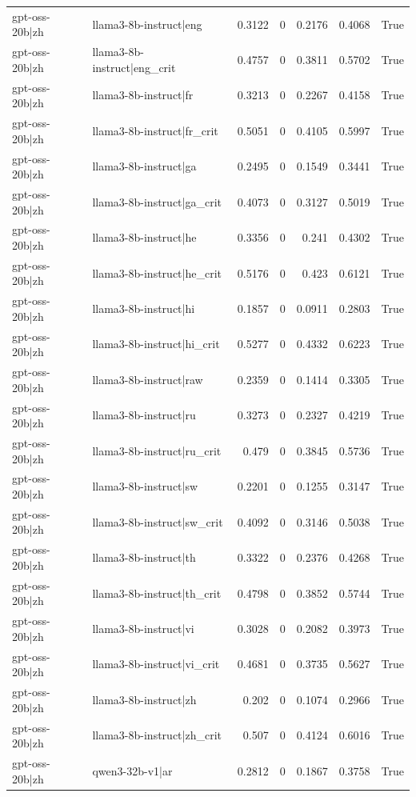 \begin{table}
\begin{tabular}{l l r r r r l}
gpt-oss-20b|zh & llama3-8b-instruct|eng & 0.3122 & 0 & 0.2176 & 0.4068 & True \\
gpt-oss-20b|zh & llama3-8b-instruct|eng_crit & 0.4757 & 0 & 0.3811 & 0.5702 & True \\
gpt-oss-20b|zh & llama3-8b-instruct|fr & 0.3213 & 0 & 0.2267 & 0.4158 & True \\
gpt-oss-20b|zh & llama3-8b-instruct|fr_crit & 0.5051 & 0 & 0.4105 & 0.5997 & True \\
gpt-oss-20b|zh & llama3-8b-instruct|ga & 0.2495 & 0 & 0.1549 & 0.3441 & True \\
gpt-oss-20b|zh & llama3-8b-instruct|ga_crit & 0.4073 & 0 & 0.3127 & 0.5019 & True \\
gpt-oss-20b|zh & llama3-8b-instruct|he & 0.3356 & 0 & 0.241 & 0.4302 & True \\
gpt-oss-20b|zh & llama3-8b-instruct|he_crit & 0.5176 & 0 & 0.423 & 0.6121 & True \\
gpt-oss-20b|zh & llama3-8b-instruct|hi & 0.1857 & 0 & 0.0911 & 0.2803 & True \\
gpt-oss-20b|zh & llama3-8b-instruct|hi_crit & 0.5277 & 0 & 0.4332 & 0.6223 & True \\
gpt-oss-20b|zh & llama3-8b-instruct|raw & 0.2359 & 0 & 0.1414 & 0.3305 & True \\
gpt-oss-20b|zh & llama3-8b-instruct|ru & 0.3273 & 0 & 0.2327 & 0.4219 & True \\
gpt-oss-20b|zh & llama3-8b-instruct|ru_crit & 0.479 & 0 & 0.3845 & 0.5736 & True \\
gpt-oss-20b|zh & llama3-8b-instruct|sw & 0.2201 & 0 & 0.1255 & 0.3147 & True \\
gpt-oss-20b|zh & llama3-8b-instruct|sw_crit & 0.4092 & 0 & 0.3146 & 0.5038 & True \\
gpt-oss-20b|zh & llama3-8b-instruct|th & 0.3322 & 0 & 0.2376 & 0.4268 & True \\
gpt-oss-20b|zh & llama3-8b-instruct|th_crit & 0.4798 & 0 & 0.3852 & 0.5744 & True \\
gpt-oss-20b|zh & llama3-8b-instruct|vi & 0.3028 & 0 & 0.2082 & 0.3973 & True \\
gpt-oss-20b|zh & llama3-8b-instruct|vi_crit & 0.4681 & 0 & 0.3735 & 0.5627 & True \\
gpt-oss-20b|zh & llama3-8b-instruct|zh & 0.202 & 0 & 0.1074 & 0.2966 & True \\
gpt-oss-20b|zh & llama3-8b-instruct|zh_crit & 0.507 & 0 & 0.4124 & 0.6016 & True \\
gpt-oss-20b|zh & qwen3-32b-v1|ar & 0.2812 & 0 & 0.1867 & 0.3758 & True \\

\end{tabular}
\end{table}

